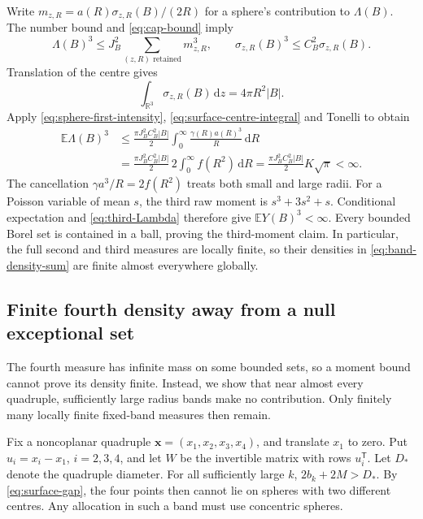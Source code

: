 \documentclass[11pt,a4paper]{article}
\numberwithin{equation}{section}
\theoremstyle{definition}
\theoremstyle{remark}
\newcommand{\R}{\mathbb R}
\newcommand{\E}{\mathbb E}
\newcommand{\dd}{\,\mathrm d}
\begin{document}
Write $m_{z,R}=a(R)\sigma_{z,R}(B)/(2R)$ for a sphere's contribution to
$\Lambda(B)$. The number bound and \eqref{eq:cap-bound} imply
\[
 \Lambda(B)^3\leq J_B^2\sum_{(z,R)\text{ retained}}m_{z,R}^3,
 \qquad
 \sigma_{z,R}(B)^3\leq C_B^2\sigma_{z,R}(B).
\]
Translation of the centre gives
\begin{equation}
 \int_{\R^3}\sigma_{z,R}(B)\dd z=4\pi R^2|B|.
 \label{eq:surface-centre-integral}
\end{equation}
Apply \eqref{eq:sphere-first-intensity},
\eqref{eq:surface-centre-integral} and Tonelli to obtain
\begin{align}
 \E\Lambda(B)^3
 &\leq\frac{\pi J_B^2C_B^2|B|}{2}
             \int_0^\infty\frac{\gamma(R)a(R)^3}{R}\dd R\nonumber\\
 &=\frac{\pi J_B^2C_B^2|B|}{2}
             \,2\int_0^\infty f(R^2)\dd R
 =\frac{\pi J_B^2C_B^2|B|}{2}K\sqrt\pi<\infty.
 \label{eq:third-Lambda}
\end{align}
The cancellation $\gamma a^3/R=2f(R^2)$ treats both small and large
radii. For a Poisson variable of mean $s$, the third raw moment is
$s^3+3s^2+s$. Conditional expectation and
\eqref{eq:third-Lambda} therefore give $\E Y(B)^3<\infty$.
Every bounded Borel set is contained in a ball, proving the third-moment
claim. In particular, the full second and third measures are locally
finite, so their densities in \eqref{eq:band-density-sum} are finite
almost everywhere globally.

\subsection{Finite fourth density away from a null exceptional set}
\label{app:radius-bound}

The fourth measure has infinite mass on some bounded sets, so a moment
bound cannot prove its density finite. Instead, we show that near almost
every quadruple, sufficiently large radius bands make no contribution.
Only finitely many locally finite fixed-band measures then remain.

Fix a noncoplanar quadruple $\mathbf x=(x_1,x_2,x_3,x_4)$, and translate
$x_1$ to zero. Put $u_i=x_i-x_1$, $i=2,3,4$, and let $W$ be the
invertible matrix with rows $u_i^{\mathsf T}$. Let $D_*$ denote the
quadruple diameter. For all sufficiently large $k$,
$2b_k+2M>D_*$. By \eqref{eq:surface-gap}, the four points then cannot
lie on spheres with two different centres. Any allocation in such a band
must use concentric spheres.
\end{document}
